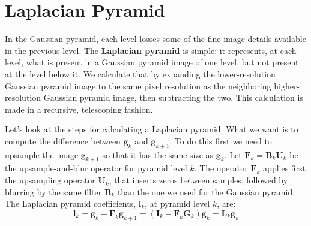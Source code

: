 %
%
%


\section{Laplacian Pyramid}

In the Gaussian pyramid, each level losses some of the fine image details available in the previous level. %
The {\bf Laplacian pyramid} \cite{Burt83} is simple:  it represents, at each level, what
is present in a Gaussian pyramid image of one level, but not present
at the level below it.  We calculate that by expanding the
lower-resolution Gaussian pyramid image to the same pixel resolution
as the neighboring higher-resolution Gaussian pyramid image, then
subtracting the two.  This calculation is made in a recursive,
telescoping fashion. 




Let's look at the steps for calculating a Laplacian pyramid.
What we want is to compute the difference between $\mathbf{g}_k$ and $\mathbf{g}_{k+1}$. To do this first we need to upsample the image $\mathbf{g}_{k+1}$ so that it has the same size as $\mathbf{g}_k$. Let $\mathbf{F}_k = \mathbf{B}_k \mathbf{U}_k$ be the upsample-and-blur operator for pyramid level $k$.  The operator $\mathbf{F}_k$ applies first the upsampling operator $\mathbf{U}_k$, that inserts zeros between samples, followed by blurring by the same filter $\mathbf{B}_k$ than the one we used for the Gaussian pyramid. The Laplacian pyramid coefficients, $\mathbf{l}_k$, at pyramid level $k$, are:  
\begin{equation}
\mathbf{l}_{k} =  \mathbf{g}_k - \mathbf{F}_k \mathbf{g}_{k+1} =  (\mathbf{I}_k - \mathbf{F}_k \mathbf{G}_k) \mathbf{g}_{k} = \mathbf{L}_k \mathbf{g}_{k}
\label{eqn:laplacian_pyr_coef}
\end{equation}


